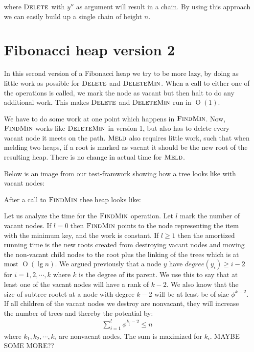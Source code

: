 \documentclass[oneside,11pt,openright]{report}
\newcommand{\BigO}[1]{\ensuremath{\operatorname{O}\left(#1\right)}}
\newcommand{\adjustimg}{%
  \ifodd\value{page}\hspace*{\dimexpr\evensidemargin-\oddsidemargin}\else\hspace*{-\dimexpr\evensidemargin-\oddsidemargin}\fi%
}
\newcommand{\centerimg}[2][width=\textwidth]{%
  \makebox[\textwidth]{\adjustimg\texttt{[image: \#2]}}%
}
\newcommand{\FindMin}{\textsc{FindMin}}
\newcommand{\DeleteMin}{\textsc{DeleteMin}}
\newcommand{\Delete}{\textsc{Delete}}
\newcommand{\Meld}{\textsc{Meld}}
\begin{document}
\begin{center}
\end{center}
where $\Delete$ with $y''$ as argument will result in a chain. By using this approach we can easily build up a single chain of height $n$.

\section{Fibonacci heap version 2}

In this second version of a Fibonacci heap we try to be more lazy, by doing as little work as possible for $\Delete$ and $\DeleteMin$. When a call to either one of the operations is called, we mark the node as vacant but then halt to do any additional work. This makes $\Delete$ and $\DeleteMin$ run in $\BigO{1}$.

We have to do some work at one point which happens in $\FindMin$. Now, $\FindMin$ works like $\DeleteMin$ in version 1, but also has to delete every vacant node it meets on the path. $\Meld$ also requires little work, such that when melding two heaps, if a root is marked as vacant it should be the new root of the resulting heap. There is no change in actual time for $\Meld$.

Below is an image from our test-framwork showing how a tree looks like with vacant nodes:

\mbox{} \par
\noindent\centerimg{delete_39}
After a call to $\FindMin$ thee heap looks like:

\mbox{} \par
\noindent\centerimg{find_min}

Let us analyze the time for the $\FindMin$ operation. Let $l$ mark the number of vacant nodes. If $l=0$ then $\FindMin$ points to the node representing the item with the minimum key, and the work is constant. If $l \ge 1$ then the amortized running time is the new roots created from destroying vacant nodes and moving the non-vacant child nodes to the root plus the linking of the trees which is at most $\BigO{\lg n}$. We argued previously that a node $y$ have $degree(y_i) \ge i - 2$ for $i = 1,2,\cdots,k$ where $k$ is the degree of its parent. We use this to say that at least one of the vacant nodes will have a rank of $k-2$. We also know that the size of subtree rootet at a node with degree $k-2$ will be at least be of size $\phi^{k-2}$. If all children of the vacant nodes we destroy are nonvacant, they will increase the number of trees and thereby the potential by:
\begin{align*}
\sum_{i=1}^l \phi^{k_j-2} \le n
 \end{align*}
where $k_1, k_2,\cdots,k_i$ are nonvacant nodes. The sum is maximized for $k_i$. MAYBE SOME MORE??
\end{document}
